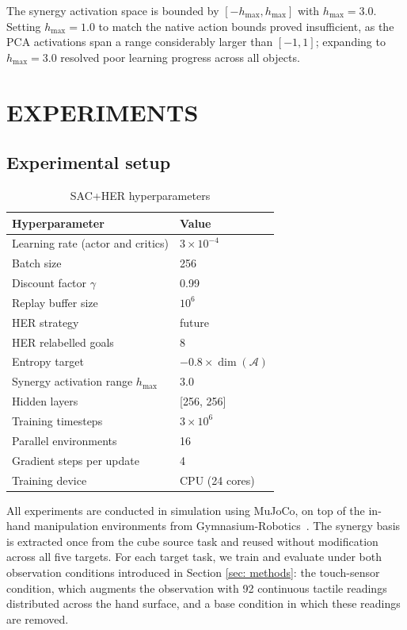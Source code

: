 \documentclass[letterpaper, 10 pt, conference]{ieeeconf}  %
\begin{document}
The synergy activation space is bounded by $[-h_{\max}, h_{\max}]$ with 
$h_{\max} = 3.0$. Setting $h_{\max} = 1.0$ to match the native action 
bounds proved insufficient, as the PCA activations span a range 
considerably larger than $[-1, 1]$; expanding to $h_{\max} = 3.0$ 
resolved poor learning progress across all objects.

\section{EXPERIMENTS}
\label{sec:experiments}
\subsection{Experimental setup}

\begin{table}[b]
        \caption{SAC+HER hyperparameters}
        \label{tab:hyperparam}
        \begin{center}
        \begin{tabular}{ll}
        \hline
        \textbf{Hyperparameter} & \textbf{Value} \\
        \hline
        Learning rate (actor and critics) & $3 \times 10^{-4}$ \\
        Batch size & 256 \\
        Discount factor $\gamma$ & 0.99 \\
        Replay buffer size & $10^6$ \\
        HER strategy & future \\
        HER relabelled goals & 8 \\
        Entropy target & $-0.8 \times \dim(\mathcal{A})$ \\
        Synergy activation range $h_{\max}$ & 3.0 \\
        Hidden layers & {[256, 256]} \\
        Training timesteps & $3 \times 10^6$ \\
        Parallel environments & 16 \\
        Gradient steps per update & 4 \\
        Training device & CPU (24 cores) \\
        \hline
        \end{tabular}
        \end{center}
        \end{table}


All experiments are conducted in simulation using MuJoCo, on top of the in-hand manipulation environments from Gymnasium-Robotics~\cite{c18}. The synergy basis is extracted once from the cube source task and reused without modification across all five targets. For each target task, we train and evaluate under both observation conditions introduced in Section \ref{sec: methods}: the touch-sensor condition, which augments the observation with 92 continuous tactile readings distributed across the hand surface, and a base condition in which these readings are removed. 
\end{document}
